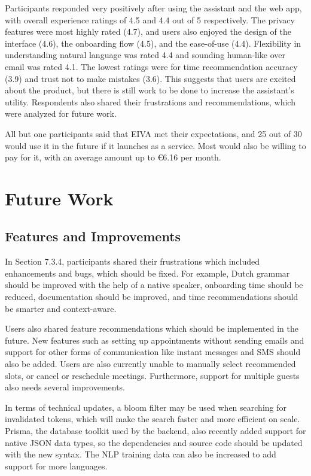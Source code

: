 \documentclass{article}
\begin{document}
Participants responded very positively after using the assistant and the web app, with overall experience ratings of 4.5 and 4.4 out of 5 respectively. The privacy features were most highly rated (4.7), and users also enjoyed the design of the interface (4.6), the onboarding flow (4.5), and the ease-of-use (4.4). Flexibility in understanding natural language was rated 4.4 and sounding human-like over email was rated 4.1. The lowest ratings were for time recommendation accuracy (3.9) and trust not to make mistakes (3.6).  This suggests that users are excited about the product, but there is still work to be done to increase the assistant's utility. Respondents also shared their frustrations and recommendations, which were analyzed for future work.

All but one participants said that EIVA met their expectations, and 25 out of 30 would use it in the future if it launches as a service. Most would also be willing to pay for it, with an average amount up to €6.16 per month.

\newpage

\section{Future Work}

\subsection{Features and Improvements}

In Section 7.3.4, participants shared their frustrations which included enhancements and bugs, which should be fixed. For example, Dutch grammar should be improved with the help of a native speaker, onboarding time should be reduced, documentation should be improved, and time recommendations should be smarter and context-aware.

Users also shared feature recommendations which should be implemented in the future. New features such as setting up appointments without sending emails and support for other forms of communication like instant messages and SMS should also be added. Users are also currently unable to manually select recommended slots, or cancel or reschedule meetings. Furthermore, support for multiple guests also needs several improvements.

In terms of technical updates, a bloom filter may be used when searching for invalidated tokens, which will make the search faster and more efficient on scale. Prisma, the database toolkit used by the backend, also recently added support for native JSON data types, so the dependencies and source code should be updated with the new syntax. The NLP training data can also be increased to add support for more languages.
\end{document}
